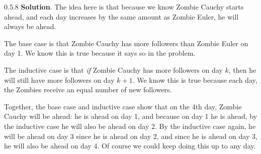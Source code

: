 \documentclass[11pt,]{book}
\theoremstyle{ptxplainnotitle}
\theoremstyle{ptxplaintitle}
\theoremstyle{ptxdefinitionnotitle}
\theoremstyle{ptxdefinitiontitle}
\theoremstyle{ptxdefinitionnotitle}
\theoremstyle{ptxdefinitiontitle}
\theoremstyle{ptxdefinitionnotitle}
\theoremstyle{ptxdefinitiontitle}
\theoremstyle{ptxdefinitiontitlenonumber}
\theoremstyle{ptxdefinitiontitlenonumber}
\numberwithin{equation}{chapter}
\begin{document}
\begin{divisionexercise}{0.5.8}
\textbf{Solution}.\quad%
\hypertarget{p-632}{}%
The idea here is that because we know Zombie Cauchy starts ahead, and each day increases by the same amount as Zombie Euler, he will always be ahead.%
\par
\hypertarget{p-633}{}%
The base case is that Zombie Cauchy has more followers than Zombie Euler on day 1. We know this is true because it says so in the problem.%
\par
\hypertarget{p-634}{}%
The inductive case is that \emph{if} Zombie Cauchy has more followers on day \(k\), then he will still have more followers on day \(k+1\). We know this is true because each day, the Zombies receive an equal number of new followers.%
\par
\hypertarget{p-635}{}%
Together, the base case and inductive case show that on the 4th day, Zombie Cauchy will be ahead: he is ahead on day 1, and because on day 1 he is ahead, by the inductive case he will also be ahead on day 2. By the inductive case again, he will be ahead on day 3 since he is ahead on day 2, and since he is ahead on day 3, he will also be ahead on day 4. Of course we could keep doing this up to any day.%
\end{divisionexercise}%
\end{document}
